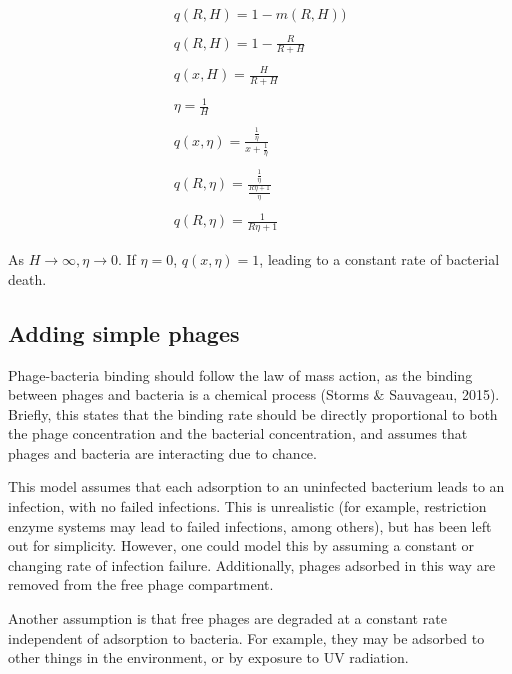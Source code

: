 \documentclass{article}
\begin{document}
\begin{center}
\begin {equation} 
\begin{split}
q(R, H) = 1-m(R, H)) \\ \\ q(R, H) = 1 - \frac{R}{R+H}\\ \\  q(x, H) = \frac{H}{R+H} \\ \\ \eta = \frac{1}{H} \\ \\ q(x, \eta) = \frac{\frac{1}{\eta}}{x+\frac{1}{\eta}} \\ \\ q(R, \eta) = \frac{\frac{1}{\eta}}{\frac{R\eta + 1}{\eta}} \\ \\ q(R, \eta) = \frac{1}{R\eta + 1} 
\end{split}
\end {equation}
\end{center}

As $H \rightarrow \infty, \eta \rightarrow 0$. If $\eta=0$, $q(x, \eta) = 1$, leading to a constant rate of bacterial death. 

\subsection{Adding simple phages}
Phage-bacteria binding should follow the law of mass action, as the binding between phages and bacteria is a chemical process (Storms $\&$ Sauvageau, 2015). Briefly, this states that the binding rate should be directly proportional to both the phage concentration and the bacterial concentration, and assumes that phages and bacteria are interacting due to chance.

This model assumes that each adsorption to an uninfected bacterium leads to an infection, with no failed infections. This is unrealistic (for example, restriction enzyme systems may lead to failed infections, among others), but has been left out for simplicity. However, one could model this by assuming a constant or changing rate of infection failure. Additionally, phages adsorbed in this way are removed from the free phage compartment. 

Another assumption is that free phages are degraded at a constant rate independent of adsorption to bacteria. For example, they may be adsorbed to other things in the environment, or by exposure to UV radiation. 
\end{document}
